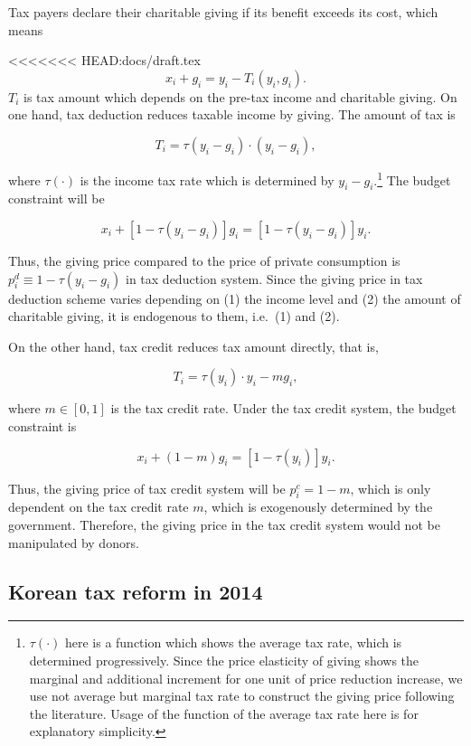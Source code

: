\documentclass[
  11pt,
  a4paper,
]{article}
\begin{document}
Tax payers declare their charitable giving if its benefit exceeds its cost, which means

<<<<<<< HEAD:docs/draft.tex
  \[
      x_i + g_i = y_i - T_i(y_i, g_i).
  \]
  \(T_i\) is tax amount which depends on the pre-tax income and charitable giving.
  On one hand, tax deduction reduces taxable income by giving. The amount of tax is

  \[
      T_i = \tau(y_i - g_i) \cdot (y_i - g_i),
  \]

  where \(\tau(\cdot)\) is the income tax rate which is determined by \(y_i - g_i\).\footnote{\(\tau(\cdot)\) here is a function which shows the average tax rate, which is determined progressively. Since the price elasticity of giving shows the marginal and additional increment for one unit of price reduction increase, we use not average but marginal tax rate to construct the giving price following the literature. Usage of the function of the average tax rate here is for explanatory simplicity.} The budget constraint will be

  \[
      x_i + [1 - \tau(y_i - g_i)]g_i = [1 - \tau(y_i - g_i)] y_i.
  \]

  Thus, the giving price compared to the price of private consumption is \(p_i^{d} \equiv 1 - \tau(y_i - g_i)\) in tax deduction system. Since the giving price in tax deduction scheme varies depending on (1) the income level and (2) the amount of charitable giving, it is endogenous to them, i.e.~(1) and (2).

  On the other hand, tax credit reduces tax amount directly, that is,

  \[
      T_i = \tau(y_i)\cdot y_i - m g_i,
  \]

  where \(m \in [0, 1]\) is the tax credit rate. Under the tax credit system, the budget constraint is

  \[
      x_i + (1 - m) g_i = [1 - \tau(y_i)] y_i.
  \]

  Thus, the giving price of tax credit system will be \(p_i^c = 1 - m\), which is only dependent on the tax credit rate \(m\), which is exogenously determined by the government.
  Therefore, the giving price in the tax credit system would not be manipulated by donors.

  \hypertarget{korean-tax-reform-in-2014}{%
  \subsection{Korean tax reform in 2014}\label{korean-tax-reform-in-2014}}
\end{document}
